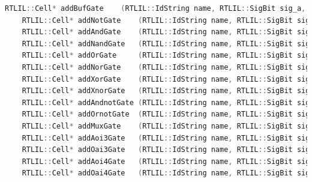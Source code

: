 \documentclass[11pt]{report}
\begin{document}
\begin{lstlisting}[language=C++]
	RTLIL::Cell* addBufGate    (RTLIL::IdString name, RTLIL::SigBit sig_a, RTLIL::SigBit sig_y, const std::string &src = "");
	RTLIL::Cell* addNotGate    (RTLIL::IdString name, RTLIL::SigBit sig_a, RTLIL::SigBit sig_y, const std::string &src = "");
	RTLIL::Cell* addAndGate    (RTLIL::IdString name, RTLIL::SigBit sig_a, RTLIL::SigBit sig_b, RTLIL::SigBit sig_y, const std::string &src = "");
	RTLIL::Cell* addNandGate   (RTLIL::IdString name, RTLIL::SigBit sig_a, RTLIL::SigBit sig_b, RTLIL::SigBit sig_y, const std::string &src = "");
	RTLIL::Cell* addOrGate     (RTLIL::IdString name, RTLIL::SigBit sig_a, RTLIL::SigBit sig_b, RTLIL::SigBit sig_y, const std::string &src = "");
	RTLIL::Cell* addNorGate    (RTLIL::IdString name, RTLIL::SigBit sig_a, RTLIL::SigBit sig_b, RTLIL::SigBit sig_y, const std::string &src = "");
	RTLIL::Cell* addXorGate    (RTLIL::IdString name, RTLIL::SigBit sig_a, RTLIL::SigBit sig_b, RTLIL::SigBit sig_y, const std::string &src = "");
	RTLIL::Cell* addXnorGate   (RTLIL::IdString name, RTLIL::SigBit sig_a, RTLIL::SigBit sig_b, RTLIL::SigBit sig_y, const std::string &src = "");
	RTLIL::Cell* addAndnotGate (RTLIL::IdString name, RTLIL::SigBit sig_a, RTLIL::SigBit sig_b, RTLIL::SigBit sig_y, const std::string &src = "");
	RTLIL::Cell* addOrnotGate  (RTLIL::IdString name, RTLIL::SigBit sig_a, RTLIL::SigBit sig_b, RTLIL::SigBit sig_y, const std::string &src = "");
	RTLIL::Cell* addMuxGate    (RTLIL::IdString name, RTLIL::SigBit sig_a, RTLIL::SigBit sig_b, RTLIL::SigBit sig_s, RTLIL::SigBit sig_y, const std::string &src = "");
	RTLIL::Cell* addAoi3Gate   (RTLIL::IdString name, RTLIL::SigBit sig_a, RTLIL::SigBit sig_b, RTLIL::SigBit sig_c, RTLIL::SigBit sig_y, const std::string &src = "");
	RTLIL::Cell* addOai3Gate   (RTLIL::IdString name, RTLIL::SigBit sig_a, RTLIL::SigBit sig_b, RTLIL::SigBit sig_c, RTLIL::SigBit sig_y, const std::string &src = "");
	RTLIL::Cell* addAoi4Gate   (RTLIL::IdString name, RTLIL::SigBit sig_a, RTLIL::SigBit sig_b, RTLIL::SigBit sig_c, RTLIL::SigBit sig_d, RTLIL::SigBit sig_y, const std::string &src = "");
	RTLIL::Cell* addOai4Gate   (RTLIL::IdString name, RTLIL::SigBit sig_a, RTLIL::SigBit sig_b, RTLIL::SigBit sig_c, RTLIL::SigBit sig_d, RTLIL::SigBit sig_y, const std::string &src = "");


\end{lstlisting}
\end{document}
